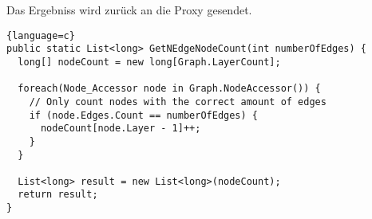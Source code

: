 Das Ergebniss wird zurück an die Proxy gesendet.

\begin{lstlisting}{language=c}
public static List<long> GetNEdgeNodeCount(int numberOfEdges) {
  long[] nodeCount = new long[Graph.LayerCount];

  foreach(Node_Accessor node in Graph.NodeAccessor()) {
    // Only count nodes with the correct amount of edges
    if (node.Edges.Count == numberOfEdges) {
      nodeCount[node.Layer - 1]++;
    }
  }

  List<long> result = new List<long>(nodeCount);
  return result;
}
\end{lstlisting}




